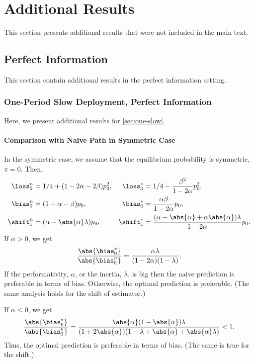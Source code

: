 \section{Additional Results}
\label{sec:add-res}

This section presents additional results that were not included in the main
text.

\subsection{Perfect Information}

This section contain additional results in the perfect information setting.

\subsubsection{One-Period Slow Deployment, Perfect Information}

Here, we present additional results for \cref{sec:one-slow}.

\paragraph{Comparison with Naive Path in Symmetric Case}

In the symmetric case, we assume that the equilibrium probability is
symmetric, $\pi = 0$. Then,
\[
    \begin{aligned}
        \loss^n_0 &= 1/4 + (1 - 2 \alpha - 2 \beta) p_0^2,
        & \loss^*_0 &= 1/4 - \frac{\beta^2}{1 - 2 \alpha} p_0^2,\\
        \bias^n_0 &= (1 - \alpha - \beta) p_0,
        & \bias^*_0 &= \frac{\alpha \beta}{1 - 2 \alpha} p_0,\\
        \shift^n_1 &= (\alpha - \abs{\alpha} \lambda) p_0,
        & \shift^*_1 &= \frac{(\alpha - \abs{\alpha} + \alpha \abs{\alpha})
        \lambda}{1 - 2 \alpha} p_0.
    \end{aligned}
\]
If $\alpha > 0$, we get
\[
    \frac{\abs{\bias^*_0}}{\abs{\bias^n_0}} = \frac{\alpha \lambda}{(1
    - 2 \alpha) (1 - \lambda)}.
\]
If the performativity, $\alpha$, or the inertia, $\lambda$, is big then the
naive prediction is preferable in terms of bias. Otherwise, the optimal
prediction is preferable. (The same analysis holds for the shift of
estimator.)

If $\alpha \le 0$, we get
\[
    \frac{\abs{\bias^*_0}}{\abs{\bias^n_0}} = \frac{\abs{\alpha} (1 -
    \abs{\alpha}) \lambda}{(1 + 2 \abs{\alpha}) (1 - \lambda + \abs{\alpha} +
    \abs{\alpha} \lambda)} < 1.
\]
Thus, the optimal prediction is preferable in terms of bias. (The same is true
for the shift.)

